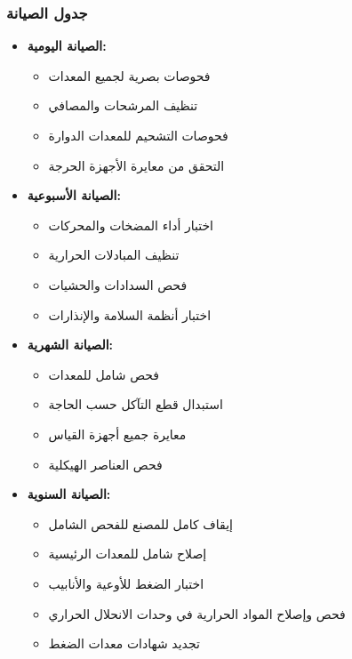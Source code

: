 \subsubsection{جدول الصيانة}
\begin{itemize}
    \item \textbf{الصيانة اليومية:}
    \begin{itemize}
        \item فحوصات بصرية لجميع المعدات
        \item تنظيف المرشحات والمصافي
        \item فحوصات التشحيم للمعدات الدوارة
        \item التحقق من معايرة الأجهزة الحرجة
    \end{itemize}
    
    \item \textbf{الصيانة الأسبوعية:}
    \begin{itemize}
        \item اختبار أداء المضخات والمحركات
        \item تنظيف المبادلات الحرارية
        \item فحص السدادات والحشيات
        \item اختبار أنظمة السلامة والإنذارات
    \end{itemize}
    
    \item \textbf{الصيانة الشهرية:}
    \begin{itemize}
        \item فحص شامل للمعدات
        \item استبدال قطع التآكل حسب الحاجة
        \item معايرة جميع أجهزة القياس
        \item فحص العناصر الهيكلية
    \end{itemize}
    
    \item \textbf{الصيانة السنوية:}
    \begin{itemize}
        \item إيقاف كامل للمصنع للفحص الشامل
        \item إصلاح شامل للمعدات الرئيسية
        \item اختبار الضغط للأوعية والأنابيب
        \item فحص وإصلاح المواد الحرارية في وحدات الانحلال الحراري
        \item تجديد شهادات معدات الضغط
    \end{itemize}
\end{itemize}

